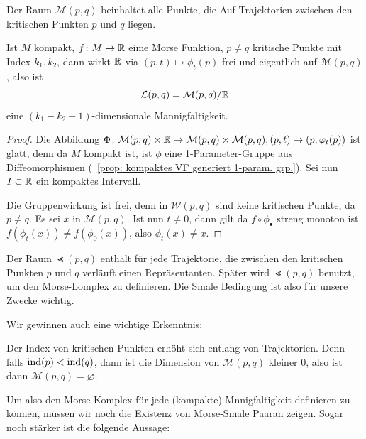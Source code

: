 Der Raum $\mathcal{M} (p, q)$ beinhaltet alle Punkte, die Auf Trajektorien zwischen den kritischen
Punkten $p$ und $q$ liegen. 


\begin{prop}
    Ist $M$ kompakt, $f \colon M \to { \mathbb R }$ eime Morse Funktion, $p \neq q$ kritische Punkte mit Index
    $k_1, k_2$, dann wirkt ${ \mathbb R }$ via $(p, t) \mapsto \phi_t(p)$ frei und eigentlich auf 
    $\mathcal{M} (p, q)$, also ist
    \[ { \mathcal{L} } (p, q) = \mathcal{M}(p, q)/{ \mathbb R } \]
    eine $(k_1 - k_2 - 1)$-dimensionale Mannigfaltigkeit.
\end{prop}

\begin{proof}
    Die Abbildung 
    $\Phi \colon \mathcal{M} (p , q) \times { \mathbb R } \to \mathcal{M} (p, q) \times \mathcal{M} (p,q) ; 
    (p, t) \mapsto (p, \varphi_t(p))$ ist glatt, denn da $M$ kompakt ist, ist $\phi$ eine 
    1-Parameter-Gruppe aus Diffeomorphismen (~\ref{prop: kompaktes VF generiert 1-param. grp.}). 
    Sei nun $I \subset { \mathbb R }$ ein kompaktes Intervall. 

    Die Gruppenwirkung ist frei, denn in $\mathcal{W} (p, q)$
    sind keine kritischen Punkte, da $p \neq q$. Es sei $x$ in $\mathcal{M} (p, q)$. 
    Ist nun $t \neq 0$, dann gilt da $f \circ \phi_{\bullet}$ streng monoton ist 
    $f(\phi_t(x)) \neq f(\phi_0(x))$, also $\phi_t(x) \neq x$.
\end{proof}

Der Raum $\Lt (p, q)$ enthält für jede Trajektorie, die zwischen den kritischen Punkten $p$ und $q$ 
verläuft einen Repräsentanten. Später wird $\Lt (p, q)$ benutzt, um den Morse-Lomplex zu definieren.
Die Smale Bedingung ist also für unsere Zwecke wichtig. 

Wir gewinnen auch eine wichtige Erkenntnis: 

\begin{corollary}
    Der Index von kritischen Punkten erhöht sich entlang von Trajektorien. Denn falls 
    ${ \operatorname{ind} } (p) < { \operatorname{ind} } (q)$, dann ist die Dimension von $\mathcal{M} (p, q)$
    kleiner $0$, also ist dann $\mathcal{M} (p, q) = \varnothing$.
\end{corollary}

Um also den Morse Komplex für jede (kompakte) Mnnigfaltigkeit definieren zu können, müssen wir noch die 
Existenz von Morse-Smale Paaran zeigen. Sogar noch stärker ist die folgende Aussage:

